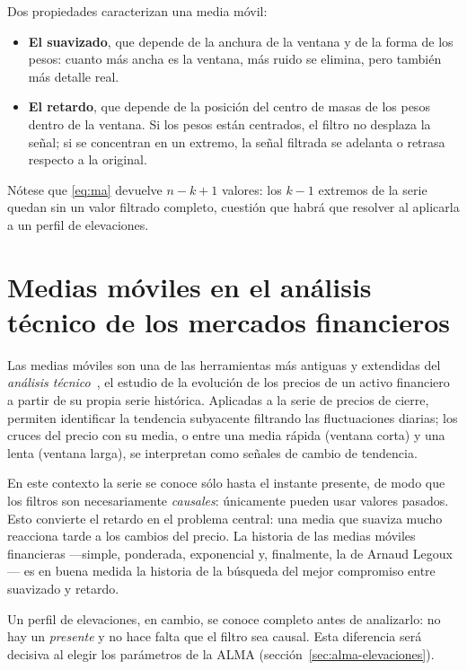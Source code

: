\documentclass[11pt,a4paper]{article}
\begin{document}
Dos propiedades caracterizan una media móvil:
\begin{itemize}
    \item \textbf{El suavizado}, que depende de la anchura de la ventana y de la
          forma de los pesos: cuanto más ancha es la ventana, más ruido se
          elimina, pero también más detalle real.
    \item \textbf{El retardo}, que depende de la posición del centro de masas
          de los pesos dentro de la ventana. Si los pesos están centrados, el
          filtro no desplaza la señal; si se concentran en un extremo, la señal
          filtrada se adelanta o retrasa respecto a la original.
\end{itemize}

Nótese que \eqref{eq:ma} devuelve $n - k + 1$ valores: los $k - 1$ extremos
de la serie quedan sin un valor filtrado completo, cuestión que habrá que
resolver al aplicarla a un perfil de elevaciones.

\section{Medias móviles en el análisis técnico de los mercados financieros}

Las medias móviles son una de las herramientas más antiguas y extendidas del
\emph{análisis técnico}~\cite{murphy}, el estudio de la evolución de los precios de un activo
financiero a partir de su propia serie histórica. Aplicadas a la serie de
precios de cierre, permiten identificar la tendencia subyacente filtrando las
fluctuaciones diarias; los cruces del precio con su media, o entre una media
rápida (ventana corta) y una lenta (ventana larga), se interpretan como señales
de cambio de tendencia.

En este contexto la serie se conoce sólo hasta el instante presente, de modo
que los filtros son necesariamente \emph{causales}: únicamente pueden usar
valores pasados. Esto convierte el retardo en el problema central: una media
que suaviza mucho reacciona tarde a los cambios del precio. La historia de las
medias móviles financieras ---simple, ponderada, exponencial y, finalmente, la
de Arnaud Legoux--- es en buena medida la historia de la búsqueda del mejor
compromiso entre suavizado y retardo.

Un perfil de elevaciones, en cambio, se conoce completo antes de analizarlo:
no hay un \emph{presente} y no hace falta que el filtro sea causal. Esta
diferencia será decisiva al elegir los parámetros de la ALMA
(sección~\ref{sec:alma-elevaciones}).
\end{document}

